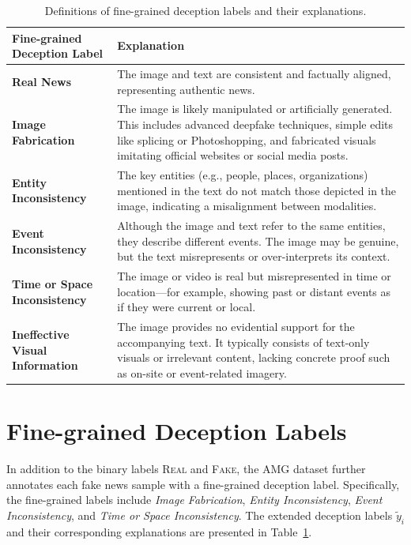 
\appendix


\begin{table}[htb]
\small
\centering
\caption{Definitions of fine-grained deception labels and their explanations.}
\renewcommand{\arraystretch}{1}  %
\setlength{\tabcolsep}{6pt}         %
\begin{tabular}{>{\bfseries}l m{12.5cm}}
\toprule
Fine-grained Deception Label & \textbf{Explanation} \\
\midrule
Real News & The image and text are consistent and factually aligned, representing authentic news. \\
Image Fabrication & The image is likely manipulated or artificially generated. This includes advanced deepfake techniques, simple edits like splicing or Photoshopping, and fabricated visuals imitating official websites or social media posts. \\
Entity Inconsistency & The key entities (e.g., people, places, organizations) mentioned in the text do not match those depicted in the image, indicating a misalignment between modalities. \\
Event Inconsistency & Although the image and text refer to the same entities, they describe different events. The image may be genuine, but the text misrepresents or over-interprets its context. \\
Time or Space Inconsistency & The image or video is real but misrepresented in time or location---for example, showing past or distant events as if they were current or local. \\
Ineffective Visual Information & The image provides no evidential support for the accompanying text. It typically consists of text-only visuals or irrelevant content, lacking concrete proof such as on-site or event-related imagery. \\
\bottomrule
\end{tabular}

\label{tab:fine_label}
\end{table}


\section{Fine-grained Deception Labels}
\label{appendix:deception_label}
In addition to the binary labels \textsc{Real} and \textsc{Fake}, the AMG dataset further annotates each fake news sample with a fine-grained deception label. Specifically, the fine-grained labels include \textit{Image Fabrication}, \textit{Entity Inconsistency}, \textit{Event Inconsistency}, and \textit{Time or Space Inconsistency}. The extended deception labels $\tilde{y}_i$ and their corresponding explanations are presented in Table~\ref{tab:fine_label}.

